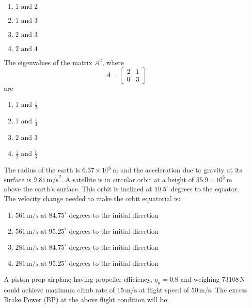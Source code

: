\begin{multicols}{4}
    \begin{enumerate}
        \item $ \text{1 and 2} $
        \item $ \text{1 and 3} $
        \item $ \text{2 and 3} $
        \item $ \text{2 and 4} $
    \end{enumerate}
\end{multicols}
\bigskip
\item The eigenvalues of the matrix $A^2$, where \[A = \begin{bmatrix} 2 & 1 \\0 & 3\end{bmatrix}\]
are
\begin{multicols}{2}
    \begin{enumerate}
        \item 1 and $\frac{1}{2}$
        \item 1 and $\frac{1}{3}$
        \item 2 and 3
        \item $\frac{1}{2}$ and $\frac{1}{3}$
    \end{enumerate}
\end{multicols}
\bigskip
\item The radius of the earth is $6.37 \times 10^6 \, \text{m}$ and the acceleration due to gravity at its surface is $9.81 \, \text{m/s}^2$. A satellite is in circular orbit at a height of $35.9 \times 10^6 \, \text{m}$ above the earth's surface. This orbit is inclined at $10.5^\circ$ degrees to the equator. The velocity change needed to make the orbit equatorial is:
    \begin{enumerate}
        \item $561 \, \text{m/s at } 84.75^\circ \text{ degrees to the initial direction}$
        \item $561 \, \text{m/s at } 95.25^\circ \text{ degrees to the initial direction}$
        \item $281 \, \text{m/s at } 84.75^\circ \text{ degrees to the initial direction}$
        \item $281 \, \text{m/s at } 95.25^\circ \text{ degrees to the initial direction}$
    \end{enumerate}
\bigskip
\item A piston-prop airplane having propeller efficiency, $\eta_p = 0.8$ and weighing $73108 \, \text{N}$ could achieve maximum climb rate of $15 \, \text{m/s}$ at flight speed of $50 \, \text{m/s}$. The excess Brake Power (BP) at the above flight condition will be:
